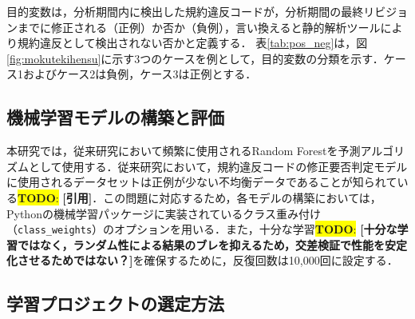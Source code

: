 \documentclass[submit]{ipsj}
\newcommand{\todo}[1]{\colorbox{yellow}{{\bf TODO}:}{\color{red} {\textbf{[#1]}}}}
\begin{document}
目的変数は，分析期間内に検出した規約違反コードが，分析期間の最終リビジョンまでに修正される（正例）か否か（負例），言い換えると静的解析ツールにより規約違反として検出されない否かと定義する．
表\ref{tab:pos_neg}は，図\ref{fig:mokutekihensu}に示す3つのケースを例として，目的変数の分類を示す．ケース1およびケース2は負例，ケース3は正例とする．

\begin{table}[t]
    \centering
    \caption{目的変数の正例と負例の分類}
    \label{tab:pos_neg}
\end{table}





\subsection{機械学習モデルの構築と評価}

本研究では，従来研究において頻繁に使用されるRandom Forestを予測アルゴリズムとして使用する．従来研究において，規約違反コードの修正要否判定モデルに使用されるデータセットは正例が少ない不均衡データであることが知られている\todo{引用}．この問題に対応するため，各モデルの構築においては，Pythonの機械学習パッケージに実装されているクラス重み付け（\texttt{class\_weights}）のオプションを用いる．また，十分な学習\todo{十分な学習ではなく，ランダム性による結果のブレを抑えるため，交差検証で性能を安定化させるためではない？}を確保するために，反復回数は10,000回に設定する．



\subsection{学習プロジェクトの選定方法} \label{subsec:選定方法}
\end{document}
